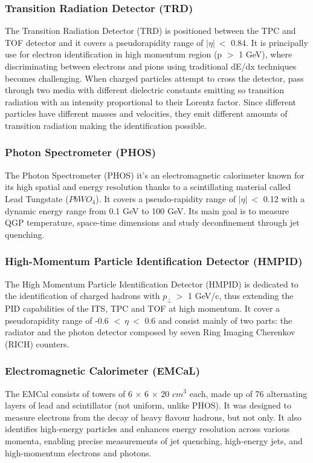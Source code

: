 \documentclass[12pt,a4paper]{book}
\begin{document}
	\subsubsection{Transition Radiation Detector (TRD)}
	The Transition Radiation Detector (TRD) is positioned between the TPC and TOF detector and it covers a pseudorapidity range of $|\eta|\ <$ 0.84. It is principally use for electron identification in high momentum region (p $>$ 1 GeV), where discriminating between electrons and pions using traditional dE/dx techniques becomes challenging. When charged particles attempt to cross the detector, pass through two media with different dielectric constants emitting so transition radiation with an intensity proportional to their Lorentz factor. Since different particles have different masses and velocities, they emit different amounts of transition radiation making the identification possible.
	\cite{Padhan:2924203} \cite{amsdottorato9036}
	
	\subsubsection{Photon Spectrometer (PHOS)}
	The Photon Spectrometer (PHOS) it's an electromagnetic calorimeter known for its  high spatial and energy resolution thanks to a scintillating material called Lead Tungstate ($PbWO_4$). It covers a pseudo-rapidity range of $ |\eta|\ <$ 0.12 with a dynamic energy range from 0.1 GeV to 100 GeV. Its main goal is to measure QGP temperature, space-time dimensions and study deconfinement through jet quenching. \cite{Padhan:2924203} \cite{amsdottorato9036}
	
	\subsubsection{High-Momentum Particle Identification Detector (HMPID)}
	The High Momentum Particle Identification Detector (HMPID) is dedicated to the identification of charged hadrons with $p_\perp \ >$ 1 GeV/c, thus extending the PID capabilities of the ITS, TPC and TOF at high momentum. It cover a pseudorapidity range of -0.6 $< \ \eta \ < $ 0.6 and consist mainly of two parts: the radiator and the photon detector composed by seven Ring Imaging Cherenkov (RICH) counters. \cite{Padhan:2924203} \cite{amsdottorato9036}
	
	\subsubsection{Electromagnetic Calorimeter (EMCaL)}
	The EMCal consists of towers of 6 × 6 × 20 $cm^3$ each, made up of 76 alternating layers of lead and scintillator (not uniform, unlike PHOS). It was designed to measure electrons from the decay of heavy flavour hadrons, but not only. It also identifies high-energy particles and enhances energy resolution across various momenta, enabling precise measurements of jet quenching, high-energy jets, and high-momentum electrons and photons.\cite{Padhan:2924203} \cite{Arata:2922803}
	
\end{document}
